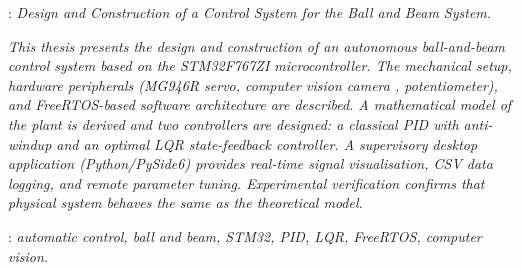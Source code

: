 \documentclass[12pt, a4paper]{report} %
\begin{document}
\begin{titlepage}
: {\itshape Design and Construction of a Control System for the Ball and Beam System.}\par
    \vspace*{1\baselineskip}
    {\itshape
    This thesis presents the design and construction of an autonomous ball-and-beam
    control system based on the STM32F767ZI microcontroller.
    The mechanical setup, hardware peripherals (MG946R servo, computer vision camera
    , potentiometer), and FreeRTOS-based software architecture are
    described.
    A mathematical model of the plant is derived and two controllers are designed:
    a classical PID with anti-windup and an optimal LQR state-feedback controller.
    A supervisory desktop application (Python/PySide6) provides real-time signal
    visualisation, CSV data logging, and remote parameter tuning.
    Experimental verification confirms that physical system behaves the same as the theoretical model.
    }
    \vspace*{1\baselineskip}

    : {\itshape automatic control, ball and beam, STM32, PID,
    LQR, FreeRTOS, computer vision.}

\end{titlepage}
\end{document}

